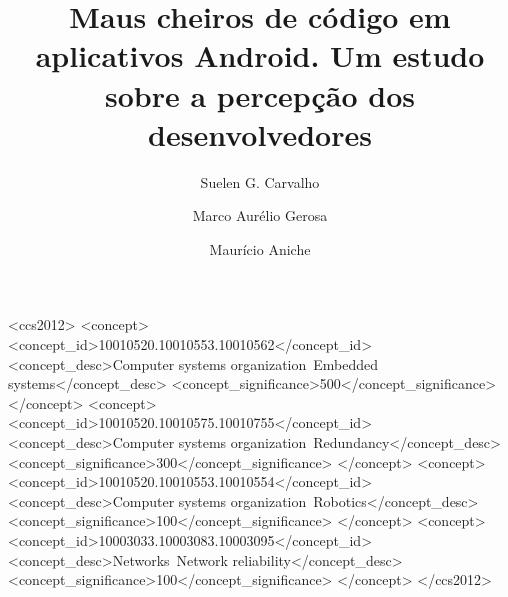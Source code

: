 \documentclass[sigconf]{acmart}
\begin{document}
\title{Maus cheiros de c\'odigo em aplicativos Android. Um estudo sobre a percep\c{c}\~ao dos desenvolvedores}


\author{Suelen G. Carvalho}

\author{Marco Aur\'elio Gerosa}

\author{Maur\'icio Aniche}



\begin{abstract}

\end{abstract}

%
%
\begin{CCSXML}
<ccs2012>
 <concept>
  <concept_id>10010520.10010553.10010562</concept_id>
  <concept_desc>Computer systems organization~Embedded systems</concept_desc>
  <concept_significance>500</concept_significance>
 </concept>
 <concept>
  <concept_id>10010520.10010575.10010755</concept_id>
  <concept_desc>Computer systems organization~Redundancy</concept_desc>
  <concept_significance>300</concept_significance>
 </concept>
 <concept>
  <concept_id>10010520.10010553.10010554</concept_id>
  <concept_desc>Computer systems organization~Robotics</concept_desc>
  <concept_significance>100</concept_significance>
 </concept>
 <concept>
  <concept_id>10003033.10003083.10003095</concept_id>
  <concept_desc>Networks~Network reliability</concept_desc>
  <concept_significance>100</concept_significance>
 </concept>
</ccs2012>  
\end{CCSXML}
\end{document}

